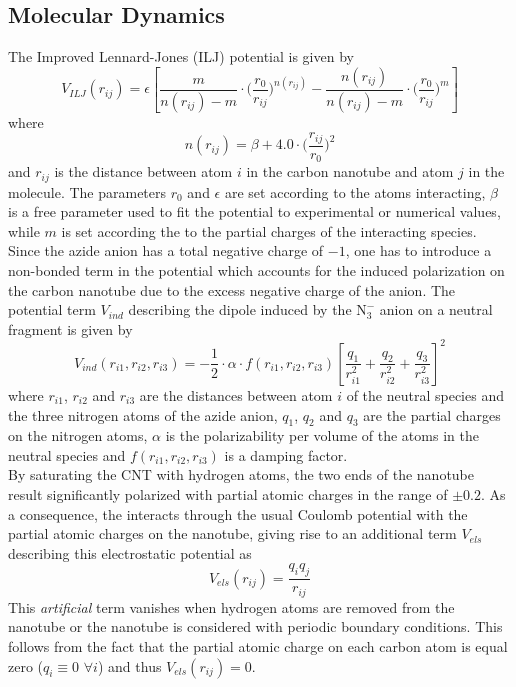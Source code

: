 \documentclass[utf8]{article}
\begin{document}
\subsection{Molecular Dynamics}
The Improved Lennard-Jones (ILJ) potential\cite{Pirani2008} is given by
%
\begin{equation}
    V_{ILJ}(r_{ij}) = \epsilon \left[ \frac{m}{n(r_{ij})-m} \cdot \Big( \frac{r_0}{r_{ij}} \Big)^{n(r_{ij})} -
                                 \frac{n(r_{ij})}{n(r_{ij})-m} \cdot \Big( \frac{r_0}{r_{ij}} \Big)^{m} \right]
\end{equation}
%
where
%
\begin{equation}
    n(r_{ij}) = \beta + 4.0 \cdot \Big( \frac{r_{ij}}{r_0} \Big)^2
\end{equation}
%
and $r_{ij}$ is the distance between atom $i$ in the carbon nanotube and atom $j$ in the \ntm molecule. The parameters $r_0$ and $\epsilon$ are set according to the atoms interacting, $\beta$ is a free parameter used to fit the potential to experimental or numerical values, while $m$ is set according the to the partial charges of the interacting species.
Since the azide anion has a total negative charge of $-1$, one has to introduce a non-bonded term in the potential which accounts for the induced polarization on the carbon nanotube due to the excess negative charge of the anion.
The potential term $V_{ind}$ describing the dipole induced by the $\text{N}_3^-$ anion on a neutral fragment is given by
%
\begin{equation}
    V_{ind}(r_{i1},r_{i2},r_{i3}) = - \frac{1}{2} \cdot \alpha \cdot f(r_{i1},r_{i2},r_{i3})
                        \left[ \frac{q_1}{r_{i1}^2} + \frac{q_2}{r_{i2}^2} + \frac{q_3}{r_{i3}^2} \right]^2
\end{equation}
%
where $r_{i1}$, $r_{i2}$ and $r_{i3}$ are the distances between atom $i$ of the neutral species and the three nitrogen atoms of the azide anion, $q_1$, $q_2$ and $q_3$ are the partial charges on the nitrogen atoms, $\alpha$ is the polarizability per volume of the atoms in the neutral species and $f(r_{i1},r_{i2},r_{i3})$ is a damping factor.\\  %
By saturating the CNT with hydrogen atoms, the two ends of the nanotube result significantly polarized with partial atomic charges in the range of $\pm 0.2$.
As a consequence, the \ntm interacts through the usual Coulomb potential with the partial atomic charges on the nanotube, giving rise to an additional term $V_{els}$ describing this electrostatic potential as
%
\begin{equation}
    V_{els}(r_{ij}) = \frac{q_i q_j}{r_{ij}}
\end{equation}
%
This \textit{artificial} term vanishes when hydrogen atoms are removed from the nanotube or the nanotube is considered with periodic boundary conditions. This follows from the fact that the partial atomic charge on each carbon atom is equal zero ($q_i \equiv 0$ $\forall i$) and thus $V_{els}(r_{ij}) = 0$.\\
\end{document}
